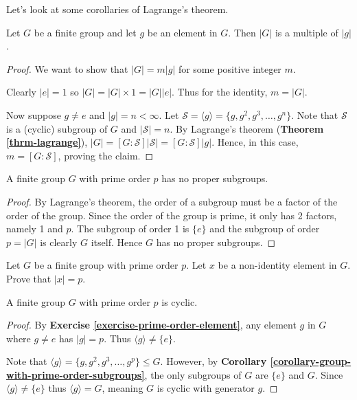 Let's look at some corollaries of Lagrange's theorem.
\begin{corollary-thrm}\label{corollary-order-of-group-multiple-of-order-of-element}
    Let $G$ be a finite group and let $g$ be an element in $G$. Then $|G|$ is a multiple of $|g|$.
\end{corollary-thrm}
\begin{proof}
    We want to show that $|G| = m|g|$ for some positive integer $m$.

    Clearly $|e| = 1$ so $|G| = |G| \times 1 = |G||e|$. Thus for the identity, $m = |G|$.

    Now suppose $g \neq e$ and $|g| = n < \infty$. Let $\mathcal{S} = \langle g \rangle = \{g, g^2, g^3, \dots, g^n\}$. Note that $\mathcal{S}$ is a (cyclic) subgroup of $G$ and $|\mathcal{S}| = n$. By Lagrange's theorem (\textbf{Theorem \ref{thrm-lagrange}}), $|G| = [G:\mathcal{S}]|\mathcal{S}| = [G:\mathcal{S}]|g|$. Hence, in this case, $m = [G:\mathcal{S}]$, proving the claim.
\end{proof}

\begin{corollary-thrm}\label{corollary-group-with-prime-order-subgroups}
    A finite group $G$ with prime order $p$ has no proper subgroups.
\end{corollary-thrm}
\begin{proof}
    By Lagrange's theorem, the order of a subgroup must be a factor of the order of the group. Since the order of the group is prime, it only has 2 factors, namely 1 and $p$. The subgroup of order 1 is $\{e\}$ and the subgroup of order $p = |G|$ is clearly $G$ itself. Hence $G$ has no proper subgroups.
\end{proof}

\begin{exercise}\label{exercise-prime-order-element}
    Let $G$ be a finite group with prime order $p$. Let $x$ be a non-identity element in $G$. Prove that $|x| = p$.
\end{exercise}

\begin{corollary-thrm}\label{corollary-group-with-prime-order-is-cyclic}
    A finite group $G$ with prime order $p$ is cyclic.
\end{corollary-thrm}
\begin{proof}
    By \textbf{Exercise \ref{exercise-prime-order-element}}, any element $g$ in $G$ where $g \neq e$ has $|g| = p$. Thus $\langle g \rangle \neq \{e\}$.

    Note that $\langle g \rangle = \{g, g^2, g^3, \dots, g^p\} \leq G$. However, by \textbf{Corollary \ref{corollary-group-with-prime-order-subgroups}}, the only subgroups of $G$ are $\{e\}$ and $G$. Since $\langle g \rangle \neq \{e\}$ thus $\langle g \rangle = G$, meaning $G$ is cyclic with generator $g$.
\end{proof}

